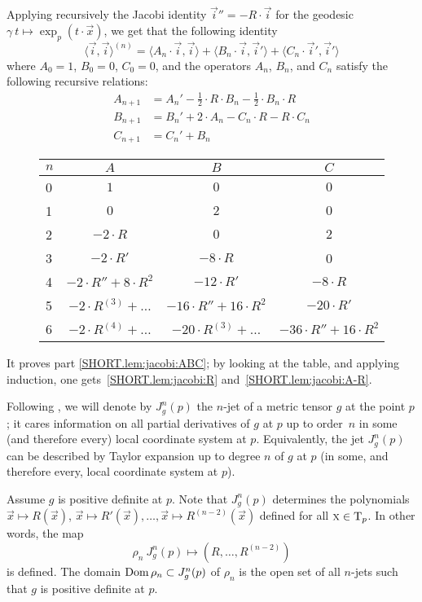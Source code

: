 \documentclass[a4paper,10pt]{article}
\begin{document}
Applying recursively the Jacobi identity $\vec{i}''=-R\cdot \vec{i}$ for the geodesic $\gamma\:t\mapsto\exp_p(t\cdot \vec{x})$, we get that the following identity 
\[\langle \vec{i},\vec{i}\rangle^{(n)}
=
\langle A_n\cdot  \vec{i},\vec{i}\rangle+ \langle B_n\cdot \vec{i},\vec{i}'\rangle+\langle C_n\cdot \vec{i}',\vec{i}'\rangle\]
where $A_0=1$, $B_0=0$, $C_0=0$, and the operators $A_n$, $B_n$, and $C_n$ satisfy the following recursive relations:
\begin{align*}
A_{n+1}&=A_n'-\tfrac12\cdot R\cdot B_n-\tfrac12\cdot B_n\cdot R
\\
B_{n+1}&=B_n'+ 2\cdot A_n-C_n\cdot R-R\cdot C_n
\\
C_{n+1}&=C_n'+ B_n
\end{align*}

\renewcommand{\arraystretch}{1.5}
\begin{figure}[!ht]
\centering
\begin{tabular}{ l|c|c|c }
$n$ & $A$ & $B$ & $C$ \\ \hline
0& $1$   &  $0$  & $0$ \\ \hline
1& $0$   &  $2$  & $0$ \\ \hline 
2& $-2\cdot R$ & $0$ & $2$ \\ \hline 
3& $-2\cdot R'$ & $-8\cdot R$ & 0  \\ \hline 
4& $-2\cdot R''+8\cdot R^2$ & $-12\cdot R'$ & $-8\cdot R$  \\ \hline
5& $-2\cdot R^{(3)}+\dots$ 
& $-16\cdot R''+16\cdot R^2$ & $-20\cdot R'$  \\ \hline
6
&$-2\cdot R^{(4)}+\dots$
&$-20\cdot R^{(3)}+\dots$
&$-36\cdot R''+16\cdot R^2$
\\
\end{tabular}
\end{figure} 

It proves part \ref{SHORT.lem:jacobi:ABC};
by looking at the table, and applying induction, one gets~\ref{SHORT.lem:jacobi:R} and~\ref{SHORT.lem:jacobi:A-R}.\qeds

Following \cite{eliashberg-mishachev}, we will denote by $J^n_g(p)$ the $n$-jet of a metric tensor $g$ at the point $p$;
it cares information on all partial derivatives of $g$ at $p$ up to order~$n$ in some (and therefore every) local coordinate system at $p$.
Equivalently, the jet $J^n_g(p)$ can be described by Taylor expansion up to degree $n$ of $g$ at $p$ (in some, and therefore every, local coordinate system at $p$).

Assume $g$ is positive definite at $p$.
Note that $J^n_g(p)$ determines the polynomials 
$\vec{x}\mapsto R(\vec{x})$, $\vec{x}\mapsto R'(\vec{x}),\dots, \vec{x}\mapsto R^{(n-2)}(\vec{x})$ defined for all $\text{\sc{x}}\in \mathrm{T}_p$. 
In other words, the map 
\[\rho_n\:J^n_g(p)\mapsto (R,\dots,R^{(n-2)})\]
is defined.
The domain $\mathop{\rm Dom}\nolimits \rho_n\subset J^n_g(p)$ of $\rho_n$ is the open set of all $n$-jets such that $g$ is positive definite at $p$.
\end{document}
